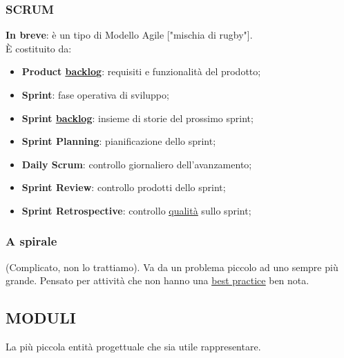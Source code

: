 			\subsubsection{SCRUM}		\label{scrum}
			\textbf{In breve}: è un tipo di Modello Agile ["mischia di rugby"]. \\
			È costituito da:
				\begin{itemize}
					\item \textbf{Product \underline{\hyperref[backlog]{backlog}}}: requisiti e funzionalità del prodotto;
					\item \textbf{Sprint}: fase operativa di sviluppo;
					\item \textbf{Sprint \underline{\hyperref[backlog]{backlog}}}: insieme di storie del prossimo sprint;
					\item \textbf{Sprint Planning}: pianificazione dello sprint;
					\item \textbf{Daily Scrum}: controllo giornaliero dell'avanzamento;
					\item \textbf{Sprint Review}: controllo prodotti dello sprint;
					\item \textbf{Sprint Retrospective}: controllo \underline{\hyperref[qualita]{qualità}} sullo sprint;
				\end{itemize}

			\subsubsection{A spirale} 
			(Complicato, non lo trattiamo). Va da un problema piccolo ad uno sempre più grande. Pensato per attività che non hanno una \underline{\hyperref[best]{best practice}} ben nota.


		\subsection{MODULI}		\label{moduli}
		La più piccola entità progettuale che sia utile rappresentare.
